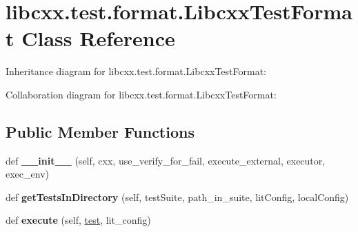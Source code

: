 \hypertarget{classlibcxx_1_1test_1_1format_1_1_libcxx_test_format}{}\section{libcxx.\+test.\+format.\+Libcxx\+Test\+Format Class Reference}
\label{classlibcxx_1_1test_1_1format_1_1_libcxx_test_format}


Inheritance diagram for libcxx.\+test.\+format.\+Libcxx\+Test\+Format\+:


Collaboration diagram for libcxx.\+test.\+format.\+Libcxx\+Test\+Format\+:
\subsection*{Public Member Functions}
\begin{DoxyCompactItemize}
\item 
\mbox{\label{classlibcxx_1_1test_1_1format_1_1_libcxx_test_format_a9dd88d3e24f66d2ac1c1696992d767a9}} 
def {\bfseries \+\_\+\+\_\+init\+\_\+\+\_\+} (self, cxx, use\+\_\+verify\+\_\+for\+\_\+fail, execute\+\_\+external, executor, exec\+\_\+env)
\item 
\mbox{\label{classlibcxx_1_1test_1_1format_1_1_libcxx_test_format_aa8d0967468b1faaf978664399b8f7bb7}} 
def {\bfseries get\+Tests\+In\+Directory} (self, test\+Suite, path\+\_\+in\+\_\+suite, lit\+Config, local\+Config)
\item 
\mbox{\label{classlibcxx_1_1test_1_1format_1_1_libcxx_test_format_a1a0106f18759bdc147b74781cadb40be}} 
def {\bfseries execute} (self, \mbox{\hyperlink{structtest}{test}}, lit\+\_\+config)
\end{DoxyCompactItemize}

